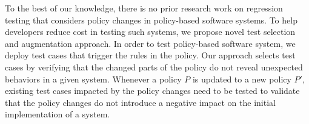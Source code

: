 To the best of our knowledge, there is no prior research work on regression testing that considers policy changes in policy-based software systems. 
To help developers reduce cost in testing such systems, we propose novel test selection and augmentation approach. 
In order to test policy-based software system, we deploy test cases that trigger the rules in the policy.
Our approach selects test cases by verifying that the changed parts of 
the policy do not reveal unexpected behaviors in a given system.
Whenever a policy $P$ is updated to a new policy $P'$,
existing test cases impacted by the policy changes need to be tested to validate that the policy changes do not introduce a negative impact on the initial implementation of a system.






